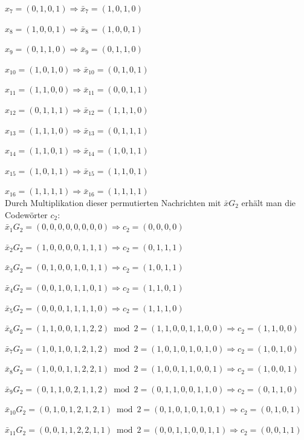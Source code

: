 \begin{Beispiel}
    $x_7= (0,1,0,1) \Rightarrow \bar{x}_{7} = (1,0,1,0)$
    
    $x_8= (1,0,0,1) \Rightarrow \bar{x}_{8} = (1,0,0,1)$
    
    $x_9= (0,1,1,0) \Rightarrow \bar{x}_{9} = (0,1,1,0)$
    
    $x_{10}= (1,0,1,0) \Rightarrow \bar{x}_{10} = (0,1,0,1)$
    
    $x_{11}= (1,1,0,0) \Rightarrow \bar{x}_{11} = (0,0,1,1)$
    
    $x_{12}= (0,1,1,1) \Rightarrow \bar{x}_{12} = (1,1,1,0)$
    
    $x_{13}= (1,1,1,0) \Rightarrow \bar{x}_{13} = (0,1,1,1)$
    
    $x_{14}= (1,1,0,1) \Rightarrow \bar{x}_{14} = (1,0,1,1)$
    
    $x_{15}= (1,0,1,1) \Rightarrow \bar{x}_{15} = (1,1,0,1)$
    
    $x_{16}= (1,1,1,1) \Rightarrow \bar{x}_{16} = (1,1,1,1)$\\

    
    Durch Multiplikation dieser permutierten Nachrichten mit  $\bar{x}G_2$ erhält man die Codewörter $c_2$:\\
    
    
    $\bar{x}_{1}G_2= (0,0,0,0,0,0,0,0) \Rightarrow c_2= (0,0,0,0)$
    
    $\bar{x}_{2}G_2= (1,0,0,0,0,1,1,1) \Rightarrow c_2= (0,1,1,1)$
    
    $\bar{x}_{3}G_2= (0,1,0,0,1,0,1,1) \Rightarrow c_2= (1,0,1,1)$
    
    $\bar{x}_{4}G_2= (0,0,1,0,1,1,0,1) \Rightarrow c_2= (1,1,0,1)$
    
    $\bar{x}_{5}G_2= (0,0,0,1,1,1,1,0) \Rightarrow c_2= (1,1,1,0)$
    
    $\bar{x}_{6}G_2= (1,1,0,0,1,1,2,2) \bmod 2 = (1,1,0,0,1,1,0,0) \Rightarrow c_2= (1,1,0,0)$
    
    $\bar{x}_{7}G_2= (1,0,1,0,1,2,1,2) \bmod 2 = (1,0,1,0,1,0,1,0 ) \Rightarrow c_2= (1,0,1,0)$
    
    $\bar{x}_{8}G_2= (1,0,0,1,1,2,2,1) \bmod 2 = (1,0,0,1,1,0,0,1) \Rightarrow c_2= (1,0,0,1)$
    
    $\bar{x}_{9}G_2= (0,1,1,0,2,1,1,2) \bmod 2 = (0,1,1,0,0,1,1,0) \Rightarrow c_2= (0,1,1,0)$
    
    $\bar{x}_{10}G_2= (0,1,0,1,2,1,2,1) \bmod 2 = (0,1,0,1,0,1,0,1) \Rightarrow c_2= (0,1,0,1)$
    
    $\bar{x}_{11}G_2= (0,0,1,1,2,2,1,1) \bmod 2 = (0,0,1,1,0,0,1,1) \Rightarrow c_2= (0,0,1,1)$
    

\end{Beispiel}
